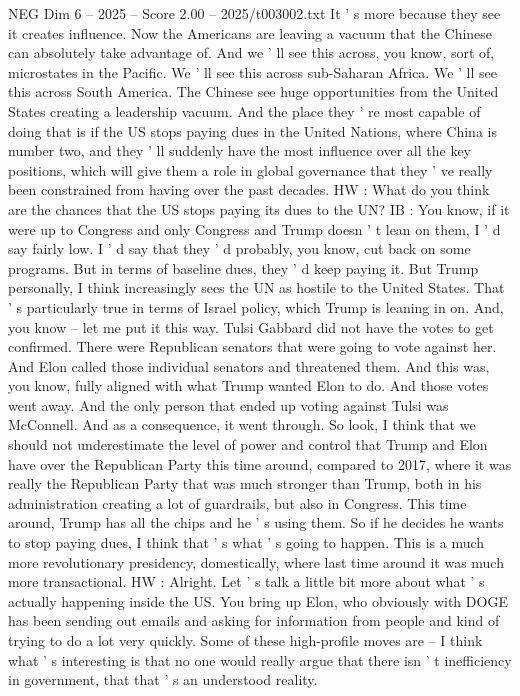 \begin{textsample}{NEG Dim 6 – 2025 – Score 2.00 – 2025/t003002.txt}
It ' s more because they see it creates influence.
Now the Americans are leaving a vacuum that the Chinese can absolutely take advantage of.
And we ' ll see this across, you know, sort of, microstates in the Pacific.
We ' ll see this across sub-Saharan Africa.
We ' ll see this across South America.
The Chinese see huge opportunities from the United States creating a leadership vacuum.
And the place they ' re most capable of doing that is if the US stops paying dues in the United Nations, where China is number two, and they ' ll suddenly have the most influence over all the key positions, which will give them a role in global governance that they ' ve really been constrained from having over the past decades.
HW : What do you think are the chances that the US stops paying its dues to the UN?
IB : You know, if it were up to Congress and only Congress and Trump doesn ' t lean on them, I ' d say fairly low.
I ' d say that they ' d probably, you know, cut back on some programs.
But in terms of baseline dues, they ' d keep paying it.
But Trump personally, I think increasingly sees the UN as hostile to the United States.
That ' s particularly true in terms of Israel policy, which Trump is leaning in on.
And, you know -- let me put it this way.
Tulsi Gabbard did not have the votes to get confirmed.
There were Republican senators that were going to vote against her.
And Elon called those individual senators and threatened them.
And this was, you know, fully aligned with what Trump wanted Elon to do.
And those votes went away.
And the only person that ended up voting against Tulsi was McConnell.
And as a consequence, it went through.
So look, I think that we should not underestimate the level of power and control that Trump and Elon have over the Republican Party this time around, compared to 2017, where it was really the Republican Party that was much stronger than Trump, both in his administration creating a lot of guardrails, but also in Congress.
This time around, Trump has all the chips and he ' s using them.
So if he decides he wants to stop paying dues, I think that ' s what ' s going to happen.
This is a much more revolutionary presidency, domestically, where last time around it was much more transactional.
HW : Alright.
Let ' s talk a little bit more about what ' s actually happening inside the US.
You bring up Elon, who obviously with DOGE has been sending out emails and asking for information from people and kind of trying to do a lot very quickly.
Some of these high-profile moves are -- I think what ' s interesting is that no one would really argue that there isn ' t inefficiency in government, that that ' s an understood reality.

\end{textsample}
